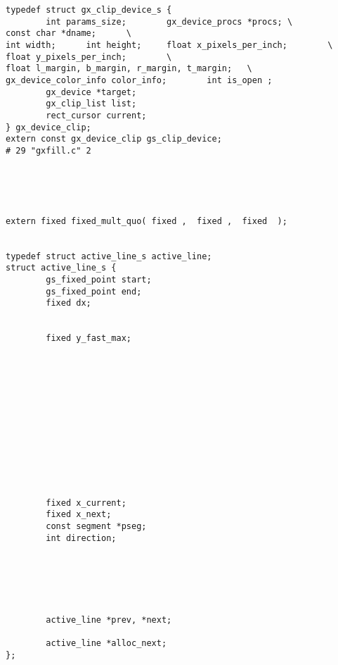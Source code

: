 \begin{verbatim}
typedef struct gx_clip_device_s {
        int params_size;        gx_device_procs *procs; \
const char *dname;      \
int width;      int height;     float x_pixels_per_inch;        \
float y_pixels_per_inch;        \
float l_margin, b_margin, r_margin, t_margin;   \
gx_device_color_info color_info;        int is_open ;
        gx_device *target;               
        gx_clip_list list;               
        rect_cursor current;
} gx_device_clip;
extern const gx_device_clip gs_clip_device;
# 29 "gxfill.c" 2


 
 
 
extern fixed fixed_mult_quo( fixed ,  fixed ,  fixed  );

 
typedef struct active_line_s active_line;
struct active_line_s {
        gs_fixed_point start;            
        gs_fixed_point end;              
        fixed dx;                        


        fixed y_fast_max;                
                                         












        fixed x_current;                 
        fixed x_next;                    
        const segment *pseg;             
        int direction;                   


 
 
 
 
        active_line *prev, *next;
 
        active_line *alloc_next;
};
\end{verbatim}
